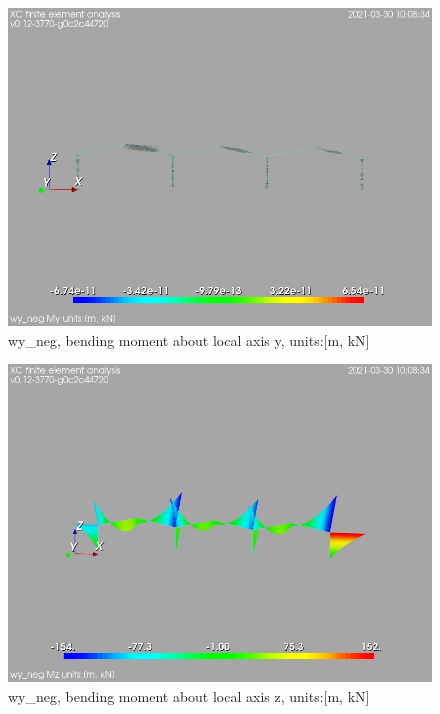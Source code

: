 \begin{figure}
\begin{center}
\includegraphics[width=\linewidth]{calc_results/sole_zeinali/text/graphics/resSimplLC/wy_negallMemberSetMy}
\caption{wy_neg, bending moment about local axis y, units:[m, kN]}
\end{center}
\end{figure}
\begin{figure}
\begin{center}
\includegraphics[width=\linewidth]{calc_results/sole_zeinali/text/graphics/resSimplLC/wy_negallMemberSetMz}
\caption{wy_neg, bending moment about local axis z, units:[m, kN]}
\end{center}
\end{figure}
